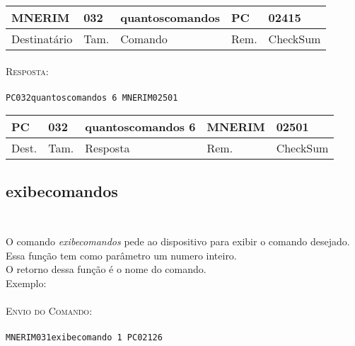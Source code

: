 \documentclass[11pt,	 papera4]{article}
\begin{document}
\begin{table}[h]
	\centering
	\begin{tabular}{p{2cm}p{1cm}p{3cm}p{1cm}p{2cm}}
		\toprule
		MNERIM & 032 & quantoscomandos & PC & 02415 \\
		\midrule	
		Destinatário & Tam. & Comando & Rem. &CheckSum \\
		\bottomrule
	\end{tabular}
	\label{tab:formatoslatex} %
\end{table}
\paragraph*{\newline\newline}
\hspace*{0.8cm}\textsc{Resposta:} \\\\ \hspace*{2cm}\texttt{PC032quantoscomandos 6 MNERIM02501
} 

\begin{table}[h]
	\centering
	\begin{tabular}{p{1cm}p{1cm}p{3cm}p{2cm}p{2cm}}
		\toprule
		PC & 032 & quantoscomandos 6  & MNERIM & 02501 \\
		\midrule	
		Dest. & Tam. & Resposta & Rem. & CheckSum \\
		\bottomrule
	\end{tabular}
	\label{tab:formatoslatex} %
\end{table}

\newpage
\subsection*{exibecomandos \\\\}
O comando \textit{exibecomandos} pede ao dispositivo para exibir o comando desejado. 
Essa função tem como parâmetro um numero inteiro.\\ O retorno dessa função é o nome do comando.\\
\newline
Exemplo:\\\\ \hspace*{0.5cm} 
\textsc{Envio do Comando:} \\\\ \hspace*{2cm} \texttt{MNERIM031exibecomando 1 PC02126} \\
\end{document}
